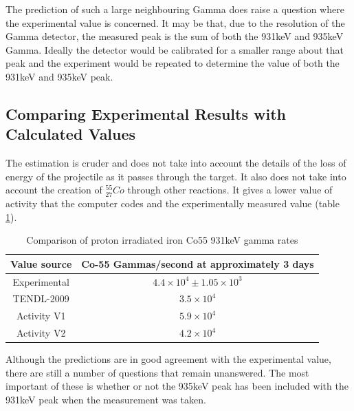 The prediction of such a large neighbouring Gamma does raise a question where the experimental value is concerned.  It may be that, due to the resolution of the Gamma detector, the measured peak is the sum of both the 931keV and 935keV Gamma.  Ideally the detector would be calibrated for a smaller range about that peak and the experiment would be repeated to determine the value of both the 931keV and 935keV peak.
 

\subsection{Comparing Experimental Results with Calculated Values}

The estimation is cruder and does not take into account the details of the loss of energy of the projectile as it passes through the target.  It also does not take into account the creation of ${}^{55}_{27} Co$ through other reactions.  It gives a lower value of activity that the computer codes and the experimentally measured value (table \ref{table:activityResultsCompared}).

\begin{table}[h]
\begin{center}
\begin{tabular}{c c}
\hline\hline
Value source & Co-55 Gammas/second at approximately 3 days \\
\hline\hline
Experimental & $4.4\times 10^4 \pm 1.05 \times 10^3$ \\
TENDL-2009 & $3.5\times10^4$ \\
Activity V1 & $5.9\times10^4$ \\
Activity V2 & $4.2\times10^4$ \\
\hline\hline
\end{tabular}
\end{center}
\caption{Comparison of proton irradiated iron Co55 931keV gamma rates}
\label{table:activityResultsCompared}
\end{table}

Although the predictions are in good agreement with the experimental value, there are still a number of questions that remain unanswered.  The most important of these is whether or not the 935keV peak has been included with the 931keV peak when the measurement was taken.





